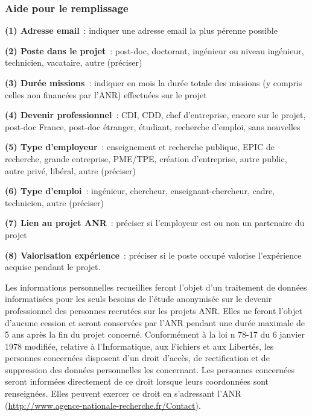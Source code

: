 \documentclass[a4paper,11pt]{article}
\newcommand{\instructions}[1]{%
		{%
			\setlength{\parindent}{0cm}%
			{\em\color{ANRvert}#1}%
		}%
	}
\newcommand{\instructions}[1]{}
\begin{document}
\begin{landscape}
{}


\instructions{%

\subsubsection{Aide pour le remplissage}
\textbf{(1) Adresse email}~: indiquer une adresse email la plus pérenne possible

\textbf{(2) Poste dans le projet}~: post-doc, doctorant, ingénieur ou niveau ingénieur, technicien, vacataire, autre (préciser)

\textbf{(3) Durée missions}~: indiquer en mois la durée totale des missions (y compris celles non financées par l'ANR) effectuées sur le projet

\textbf{(4) Devenir professionnel}~: CDI, CDD, chef d'entreprise, encore sur le projet, post-doc France, post-doc étranger, étudiant, recherche d'emploi, sans nouvelles

\textbf{(5) Type d'employeur}~: enseignement et recherche publique, EPIC de recherche, grande entreprise, PME/TPE, création d'entreprise, autre public, autre privé, libéral, autre (préciser)

\textbf{(6) Type d'emploi}~: ingénieur, chercheur, enseignant-chercheur, cadre, technicien, autre (préciser)

\textbf{(7) Lien au projet ANR}~: préciser si l'employeur est ou non un partenaire du projet 

\textbf{(8) Valorisation expérience}~: préciser si le poste occupé valorise l'expérience acquise pendant le projet.

Les informations personnelles recueillies feront l'objet d'un traitement de données informatisées pour les seuls besoins de l'étude anonymisée sur le devenir professionnel des personnes recrutées sur les projets ANR. Elles ne feront l'objet d'aucune cession et seront conservées par l'ANR pendant une durée maximale de 5 ans après la fin du projet concerné. Conformément à la loi n\textdegree{} 78-17 du 6 janvier 1978 modifiée, relative à l'Informatique, aux Fichiers et aux Libertés, les personnes concernées disposent d'un droit d'accès, de rectification et de suppression des données personnelles les concernant. Les personnes concernées seront informées directement de ce droit lorsque leurs coordonnées sont renseignées. Elles peuvent exercer ce droit en s'adressant l'ANR (\url{http://www.agence-nationale-recherche.fr/Contact}). 

}

\end{landscape}
\end{document}
